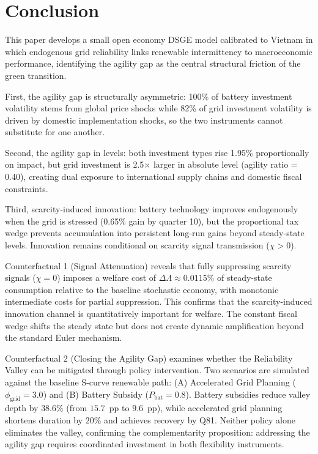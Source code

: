 	

	\section{Conclusion} \label{sec:conclusion}

	This paper develops a small open economy DSGE model calibrated to Vietnam in which endogenous grid reliability links renewable intermittency to macroeconomic performance, identifying the agility gap as the central structural friction of the green transition.

	First, the agility gap is structurally asymmetric: 100\% of battery investment volatility stems from global price shocks while 82\% of grid investment volatility is driven by domestic implementation shocks, so the two instruments cannot substitute for one another.

	Second, the agility gap in levels: both investment types rise 1.95\% proportionally on impact, but grid investment is 2.5$\times$ larger in absolute level (agility ratio = 0.40), creating dual exposure to international supply chains and domestic fiscal constraints.

	Third, scarcity-induced innovation: battery technology improves endogenously when the grid is stressed (0.65\% gain by quarter 10), but the proportional tax wedge prevents accumulation into persistent long-run gains beyond steady-state levels. Innovation remains conditional on scarcity signal transmission ($\chi > 0$).

	Counterfactual 1 (Signal Attenuation) reveals that fully suppressing scarcity signals ($\chi = 0$) imposes a welfare cost of $\Delta\Lambda \approx 0.0115\%$ of steady-state consumption relative to the baseline stochastic economy, with monotonic intermediate costs for partial suppression. This confirms that the scarcity-induced innovation channel is quantitatively important for welfare. The constant fiscal wedge shifts the steady state but does not create dynamic amplification beyond the standard Euler mechanism.

	Counterfactual 2 (Closing the Agility Gap) examines whether the Reliability Valley can be mitigated through policy intervention. Two scenarios are simulated against the baseline S-curve renewable path: (A) Accelerated Grid Planning ($\phi_{\text{grid}}=3.0$) and (B) Battery Subsidy ($P_{\text{bat}}=0.8$). Battery subsidies reduce valley depth by $38.6\%$ (from $15.7$~pp to $9.6$~pp), while accelerated grid planning shortens duration by $20\%$ and achieves recovery by Q81. Neither policy alone eliminates the valley, confirming the complementarity proposition: addressing the agility gap requires coordinated investment in both flexibility instruments.


